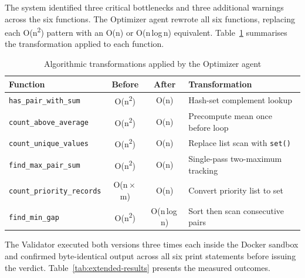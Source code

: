 The system identified three critical bottlenecks and three additional warnings across the six functions. The Optimizer agent rewrote all six functions, replacing each O(n\textsuperscript{2}) pattern with an O(n) or O(n\,log\,n) equivalent. Table~\ref{tab:extended-transforms} summarises the transformation applied to each function.

\begin{table}[H]
\centering
\caption{Algorithmic transformations applied by the Optimizer agent}
\label{tab:extended-transforms}
\begin{tabular}{|l|c|c|l|}
\hline
\textbf{Function} & \textbf{Before} & \textbf{After} & \textbf{Transformation} \\
\hline
\texttt{has\_pair\_with\_sum}     & O(n\textsuperscript{2}) & O(n)          & Hash-set complement lookup \\
\texttt{count\_above\_average}    & O(n\textsuperscript{2}) & O(n)          & Precompute mean once before loop \\
\texttt{count\_unique\_values}    & O(n\textsuperscript{2}) & O(n)          & Replace list scan with \texttt{set()} \\
\texttt{find\_max\_pair\_sum}     & O(n\textsuperscript{2}) & O(n)          & Single-pass two-maximum tracking \\
\texttt{count\_priority\_records} & O(n\,$\times$\,m)       & O(n)          & Convert priority list to set \\
\texttt{find\_min\_gap}           & O(n\textsuperscript{2}) & O(n\,log\,n)  & Sort then scan consecutive pairs \\
\hline
\end{tabular}
\end{table}

The Validator executed both versions three times each inside the Docker sandbox and confirmed byte-identical output across all six print statements before issuing the verdict. Table~\ref{tab:extended-results} presents the measured outcomes.

